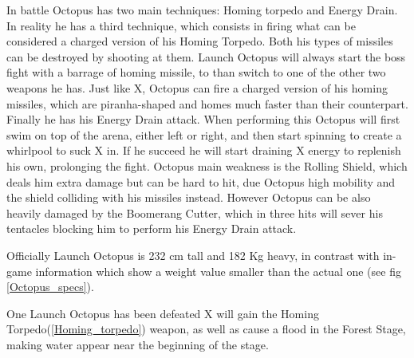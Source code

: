 In battle Octopus has two main techniques: Homing torpedo and Energy Drain. In reality he has a third technique, which consists in firing what can be considered a charged version of his Homing Torpedo. Both his types of missiles can be destroyed by shooting at them. Launch Octopus will always start the boss fight with a barrage of homing missile, to than switch to one of the other two weapons he has. Just like X, Octopus can fire a charged version of his homing missiles, which are piranha-shaped and homes much faster than their counterpart. Finally he has his Energy Drain attack. When performing this Octopus will first swim on top of the arena, either left or right, and then start spinning to create a whirlpool to suck X in. If he succeed he will start draining X energy to replenish his own, prolonging the fight. Octopus main weakness is the Rolling Shield, which deals him extra damage but can be hard to hit, due Octopus high mobility and the shield colliding with his missiles instead. However Octopus can be also heavily damaged by the Boomerang Cutter, which in three hits will sever his tentacles blocking him to perform his Energy Drain attack. 

Officially\cite{wayback:X_resources} Launch Octopus is 232 cm tall and 182 Kg heavy, in contrast with in-game information\cite{wiki:Launch_Octopus} which show a weight value smaller than the actual one (see fig \ref{Octopus_specs}).

One Launch Octopus has been defeated X will gain the Homing Torpedo(\ref{Homing_torpedo}) weapon, as well as cause a flood in the Forest Stage, making water appear near the beginning of the stage.

